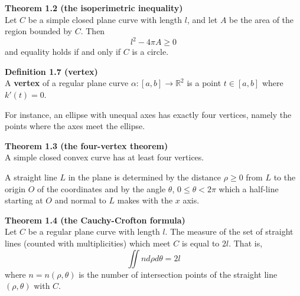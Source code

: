 \documentclass{article}
\begin{document}
\par
\textbf{Theorem 1.2 (the isoperimetric inequality)}\\
Let $C$ be a simple closed plane curve with length $l$, and let $A$ be the area of the region bounded by $C$.
Then
$$
    l^2 - 4\pi A \geq 0
$$
and equality holds if and only if $C$ is a circle.

\par
\textbf{Definition 1.7 (vertex)}\\
A \textbf{vertex} of a regular plane curve $\alpha:[a,b] \to \mathbb R^2$ is a point $t \in [a,b]$ where
$k'(t) = 0$.

\par
For instance, an ellipse with unequal axes has exactly four vertices, namely the points where the axes meet the
ellipse.

\par
\textbf{Theorem 1.3 (the four-vertex theorem)}\\
A simple closed convex curve has at least four vertices.

\par
A straight line $L$ in the plane is determined by the distance $\rho \geq 0$ from $L$ to the origin $O$ of the
coordinates and by the angle $\theta$, $0 \leq \theta < 2\pi$ which a half-line starting at $O$ and normal to
$L$ makes with the $x$ axis. 

\par
\textbf{Theorem 1.4 (the Cauchy-Crofton formula)}\\
Let $C$ be a regular plane curve with length $l$. The measure of the set of straight lines (counted with
multiplicities) which meet $C$ is equal to $2l$. That is,
$$
    \iint n d\rho d\theta = 2l
$$
where $n = n(\rho,\theta)$ is the number of intersection points of the straight line $(\rho,\theta)$ with $C$.
\end{document}

